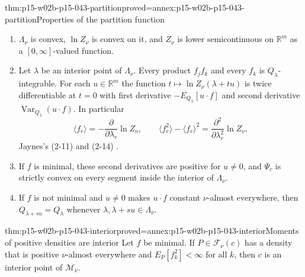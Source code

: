 \begin{hblemma}{thm:p15-w02b-p15-043-partition}{proved=annex:p15-w02b-p15-043-partition}{Properties of the partition function}
\begin{enumerate}
\item \(\Lambda_\nu\) is convex, \(\ln Z_\nu\) is convex on it, and
\(Z_\nu\) is lower semicontinuous on \(\mathbb R^m\) as a
\([0,\infty]\)-valued function.
\item Let \(\lambda\) be an interior point of \(\Lambda_\nu\). Every
product \(f_jf_k\) and every \(f_k\) is \(Q_\lambda\)-integrable. For each
\(u\in\mathbb R^m\) the function \(t\mapsto\ln Z_\nu(\lambda+tu)\) is
twice differentiable at \(t=0\) with first derivative
\(-E_{Q_\lambda}[u\cdot f]\) and second derivative
\(\operatorname{Var}_{Q_\lambda}(u\cdot f)\). In particular
\[
 \langle f_r\rangle=-\frac{\partial}{\partial\lambda_r}\ln Z_\nu,
 \qquad
 \langle f_r^2\rangle-\langle f_r\rangle^2=\frac{\partial^2}{\partial\lambda_r^2}\ln Z_\nu ,
\]
Jaynes's (2-11) and (2-14) \cite[p.~623]{Jaynes1957InformationTheory}.
\item If \(f\) is minimal, these second derivatives are positive for
\(u\neq0\), and \(\Psi_c\) is strictly convex on every segment inside the
interior of \(\Lambda_\nu\).
\item If \(f\) is not minimal and \(u\neq0\) makes \(u\cdot f\) constant
\(\nu\)-almost everywhere, then \(Q_{\lambda+su}=Q_\lambda\) whenever
\(\lambda,\lambda+su\in\Lambda_\nu\).
\end{enumerate}
\end{hblemma}

\begin{hbtheorem}{thm:p15-w02b-p15-043-interior}{proved=annex:p15-w02b-p15-043-interior}{Moments of positive densities are interior}
Let \(f\) be minimal. If \(P\in\mathcal F_\nu(c)\) has a density that is
positive \(\nu\)-almost everywhere and
\(E_P[f_k^2]<\infty\) for all \(k\), then \(c\) is an interior point of
\(\mathcal M_\nu\).
\end{hbtheorem}


